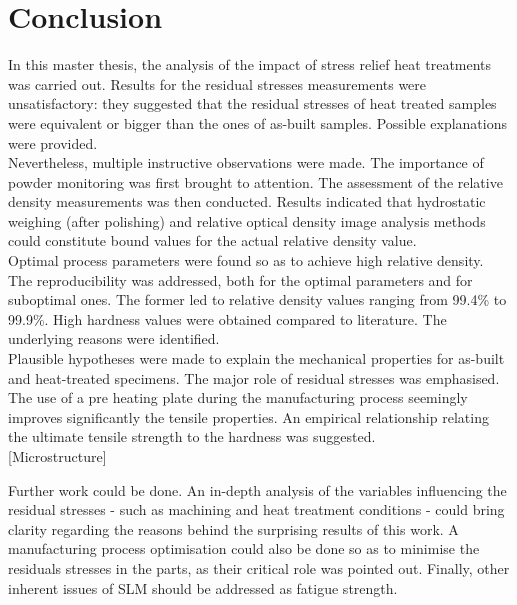 \chapter{Conclusion}
\label{Chap6}
In this master thesis, the analysis of the impact of stress relief heat treatments was carried out. Results for the residual stresses measurements were unsatisfactory: they suggested that the residual stresses of heat treated samples were equivalent or bigger than the ones of as-built samples. Possible explanations were provided.\\

Nevertheless, multiple instructive observations were made. The importance of powder monitoring was first brought to attention. The assessment of the relative density measurements was then conducted. Results indicated that hydrostatic weighing (after polishing) and relative optical density image analysis methods could constitute bound values for the actual relative density value.\\

Optimal process parameters were found so as to achieve high relative density. The reproducibility was addressed, both for the optimal parameters and for suboptimal ones. The former led to relative density values ranging from 99.4\% to 99.9\%. High hardness values were obtained compared to literature. The underlying reasons were identified.\\

Plausible hypotheses were made to explain the mechanical properties for as-built and heat-treated specimens. The major role of residual stresses was emphasised. The use of a pre heating plate during the manufacturing process seemingly improves significantly the tensile properties. An empirical relationship relating the ultimate tensile strength to the hardness was suggested.\\

[Microstructure]

Further work could be done. An in-depth analysis of the variables influencing the residual stresses - such as machining and heat treatment conditions - could bring clarity regarding the reasons behind the surprising results of this work. A manufacturing process optimisation could also be done so as to minimise the residuals stresses in the parts, as their critical role was pointed out. Finally, other inherent issues of SLM should be addressed as fatigue strength.\\


%